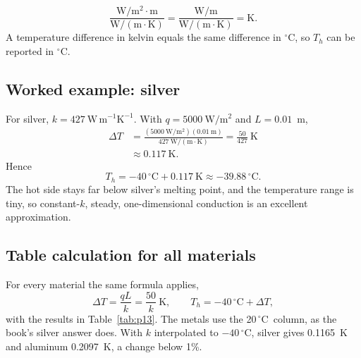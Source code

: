 \documentclass[reprint, amsmath, amssymb, aps, prl]{revtex4-2}
\newcommand{\degC}{\ensuremath{\,^\circ\mathrm{C}}}
\newcommand{\WmK}{\mathrm{W\,m^{-1}K^{-1}}}
\begin{document}
\begin{equation*}
\frac{\mathrm{W/m^2}\cdot\mathrm{m}}{\mathrm{W/(m\cdot K)}}
=\frac{\mathrm{W/m}}{\mathrm{W/(m\cdot K)}}
=\mathrm{K}.
\end{equation*}
A temperature difference in kelvin equals the same difference in $^\circ$C, so $T_h$ can
be reported in $^\circ$C.

\subsection*{Worked example: silver}

For silver, $k=427~\WmK$. With $q=5000~\mathrm{W/m^2}$ and $L=0.01$~m,
\begin{align*}
\Delta T
&=\frac{(5000~\mathrm{W/m^2})(0.01~\mathrm{m})}{427~\mathrm{W/(m\cdot K)}}
=\frac{50}{427}~\mathrm{K}\\
&\approx0.117~\mathrm{K}.
\end{align*}
Hence
\begin{equation*}
T_h=-40\degC+0.117~\mathrm{K}\approx-39.88\degC.
\end{equation*}
The hot side stays far below silver's melting point, and the temperature range is tiny,
so constant-$k$, steady, one-dimensional conduction is an excellent approximation.

\subsection*{Table calculation for all materials}

For every material the same formula applies,
\begin{equation*}
\Delta T=\frac{qL}{k}=\frac{50}{k}~\mathrm{K},
\qquad
T_h=-40\degC+\Delta T,
\end{equation*}
with the results in Table~\ref{tab:p13}. The metals use the 20\degC\ column, as the
book's silver answer does. With $k$ interpolated to $-40\degC$, silver gives 0.1165~K
and aluminum 0.2097~K, a change below 1\%.
\end{document}
